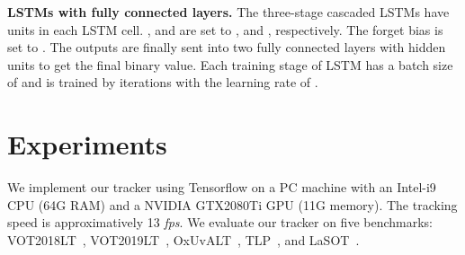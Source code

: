 \documentclass[10pt,twocolumn,letterpaper]{article}
\begin{document}
\noindent \textbf{LSTMs with fully connected layers.}
The three-stage cascaded LSTMs have  units in each LSTM cell.
,  and  are set to ,  and , respectively.
The forget bias is set to .
The outputs are finally sent into two fully connected layers with  hidden units to get the final binary value.
Each training stage of LSTM has a batch size of  and is trained by  iterations with the
learning rate of .

\vspace{-2mm}
\section{Experiments}
\vspace{-2mm}
We implement our tracker using Tensorflow on a PC machine with an Intel-i9 CPU (64G RAM)
and a NVIDIA GTX2080Ti GPU (11G memory). The tracking speed is approximatively 13
\emph{fps}.
We evaluate our tracker on five benchmarks: VOT2018LT~\cite{VOT2018report},
VOT2019LT~\cite{VOT2019report}, OxUvALT~\cite{OxUvA},
TLP~\cite{moudgil2018long}, and LaSOT~\cite{LaSOT}.

\vspace{-2mm}
\end{document}
